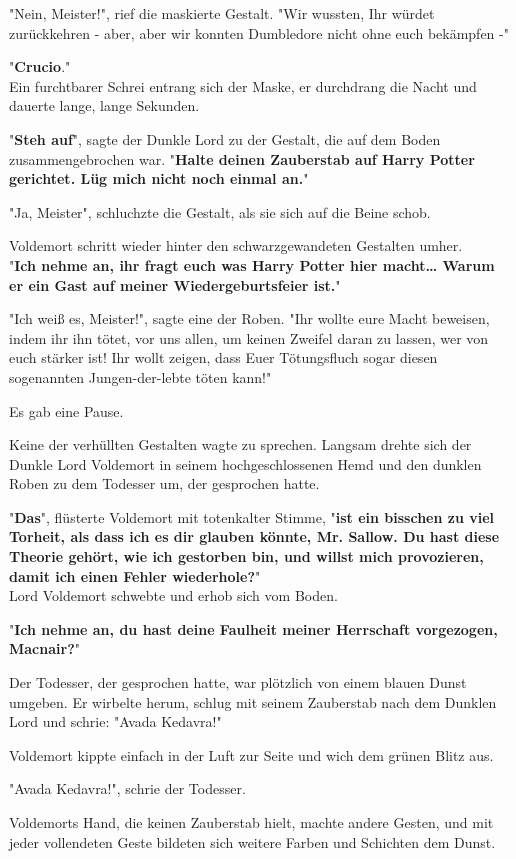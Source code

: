 {"Nein, Meister!", rief die maskierte Gestalt. "Wir wussten, Ihr würdet zurückkehren - aber, aber wir konnten Dumbledore nicht ohne euch bekämpfen -"

"\textbf{Crucio}."\\ Ein furchtbarer Schrei entrang sich der Maske, er durchdrang die Nacht und dauerte lange, lange Sekunden.

"\textbf{Steh auf}", sagte der Dunkle Lord zu der Gestalt, die auf dem Boden zusammengebrochen war. "\textbf{Halte deinen Zauberstab auf Harry Potter gerichtet. Lüg mich nicht noch einmal an.}"

"Ja, Meister", schluchzte die Gestalt, als sie sich auf die Beine schob.

Voldemort schritt wieder hinter den schwarzgewandeten Gestalten umher.\\ "\textbf{Ich nehme an, ihr fragt euch was Harry Potter hier macht… Warum er ein Gast auf meiner Wiedergeburtsfeier ist.}"

"Ich weiß es, Meister!", sagte eine der Roben. "Ihr wollte eure Macht beweisen, indem ihr ihn tötet, vor uns allen, um keinen Zweifel daran zu lassen, wer von euch stärker ist! Ihr wollt zeigen, dass Euer Tötungsfluch sogar diesen sogenannten Jungen-der-lebte töten kann!"

Es gab eine Pause.

Keine der verhüllten Gestalten wagte zu sprechen. Langsam drehte sich der Dunkle Lord Voldemort in seinem hochgeschlossenen Hemd und den dunklen Roben zu dem Todesser um, der gesprochen hatte.

"\textbf{Das}", flüsterte Voldemort mit totenkalter Stimme, "\textbf{ist ein bisschen zu viel Torheit, als dass ich es dir glauben könnte, Mr. Sallow. Du hast diese Theorie gehört, wie ich gestorben bin, und willst mich provozieren, damit ich einen Fehler wiederhole?}"\\ Lord Voldemort schwebte und erhob sich vom Boden.

"\textbf{Ich nehme an, du hast deine Faulheit meiner Herrschaft vorgezogen, Macnair?}"

Der Todesser, der gesprochen hatte, war plötzlich von einem blauen Dunst umgeben. Er wirbelte herum, schlug mit seinem Zauberstab nach dem Dunklen Lord und schrie: "Avada Kedavra!"

Voldemort kippte einfach in der Luft zur Seite und wich dem grünen Blitz aus.

"Avada Kedavra!", schrie der Todesser.

Voldemorts Hand, die keinen Zauberstab hielt, machte andere Gesten, und mit jeder vollendeten Geste bildeten sich weitere Farben und Schichten dem Dunst.

}
